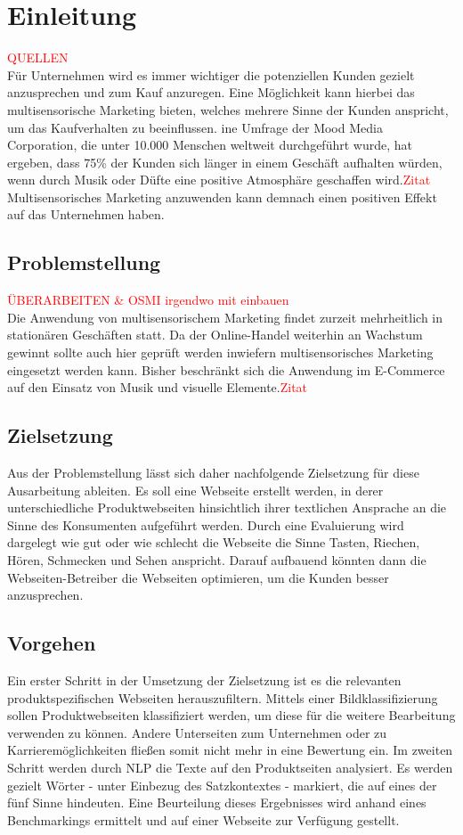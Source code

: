 \section{Einleitung}  \textcolor{red}{QUELLEN} \\
Für Unternehmen wird es immer wichtiger die potenziellen Kunden gezielt anzusprechen und zum Kauf anzuregen. Eine Möglichkeit kann hierbei das multisensorische Marketing bieten, welches mehrere Sinne der Kunden anspricht, um das Kaufverhalten zu beeinflussen. 
ine Umfrage der Mood Media Corporation, die unter 10.000 Menschen weltweit durchgeführt wurde, hat ergeben, dass 75\% der Kunden sich länger in einem Geschäft aufhalten würden, wenn durch Musik oder Düfte eine positive Atmosphäre geschaffen wird.\textcolor{red}{Zitat}
Multisensorisches Marketing anzuwenden kann demnach einen positiven Effekt auf das Unternehmen haben.

\subsection{Problemstellung}
\textcolor{red}{ÜBERARBEITEN \& OSMI irgendwo mit einbauen} \\
Die Anwendung von multisensorischem Marketing findet zurzeit mehrheitlich in stationären Geschäften statt. Da der Online-Handel weiterhin an Wachstum gewinnt sollte auch hier geprüft werden inwiefern multisensorisches Marketing eingesetzt werden kann.
Bisher beschränkt sich die Anwendung im E-Commerce auf den Einsatz von Musik und visuelle Elemente.\textcolor{red}{Zitat}

\subsection{Zielsetzung}
Aus der Problemstellung lässt sich daher nachfolgende Zielsetzung für diese Ausarbeitung ableiten. Es soll eine Webseite erstellt werden, in derer unterschiedliche Produktwebseiten hinsichtlich ihrer textlichen Ansprache an die Sinne des Konsumenten aufgeführt werden.
Durch eine Evaluierung wird dargelegt wie gut oder wie schlecht die Webseite die Sinne Tasten, Riechen, Hören, Schmecken und Sehen anspricht.
Darauf aufbauend könnten dann die Webseiten-Betreiber die Webseiten optimieren, um die Kunden besser anzusprechen.

\subsection{Vorgehen}
Ein erster Schritt in der Umsetzung der Zielsetzung ist es die relevanten produktspezifischen Webseiten herauszufiltern. Mittels einer Bildklassifizierung sollen Produktwebseiten klassifiziert werden, um diese für die weitere Bearbeitung verwenden zu können.
Andere Unterseiten zum Unternehmen oder zu Karrieremöglichkeiten fließen somit nicht mehr in eine Bewertung ein. Im zweiten Schritt werden durch \acf{NLP} die Texte auf den Produktseiten analysiert. Es werden gezielt Wörter - unter Einbezug des Satzkontextes - markiert, die auf eines der fünf Sinne hindeuten.
Eine Beurteilung dieses Ergebnisses wird anhand eines Benchmarkings ermittelt und auf einer Webseite zur Verfügung gestellt.

